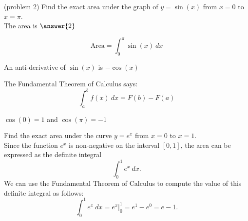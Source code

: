 \documentclass[handout]{ximera}
\begin{document}
\begin{problem}(problem 2)
Find the exact area under the graph of $y = \sin(x)$ from $x = 0$ to $x = \pi$.\\
The area is $\answer{2}$

\begin{hint}
  \[
  \text{Area} = \int_0^{\pi} \sin(x) \ dx 
  \]
\end{hint}
    \begin{hint}
      An anti-derivative of $\sin(x)$ is $-\cos(x)$
    \end{hint}
    
    \begin{hint}
      The Fundamental Theorem of Calculus says:
      \[
      \int_a^b f(x) \ dx = F(b) - F(a)
      \]
    \end{hint}    
		\begin{hint}
      $\cos(0) = 1$ and $\cos(\pi) = -1$
    \end{hint}
		
\end{problem}


\begin{example}[example 3]
Find the exact area under the curve $y = e^x$ from $x = 0$ to $x = 1$.\\
Since the function $e^x$ is non-negative on the interval $[0, 1]$, the area can be expressed as the definite integral
\[\int_0^1 e^x \ dx.\]
We can use the Fundamental Theorem of Calculus to compute the value of this definite integral as follows:
\[\int_0^{1} e^x \ dx = e^x \Big|_0^{1} = e^{1} - e^0= e- 1.\]


\begin{image}
\end{image}

\end{example}
\end{document}
